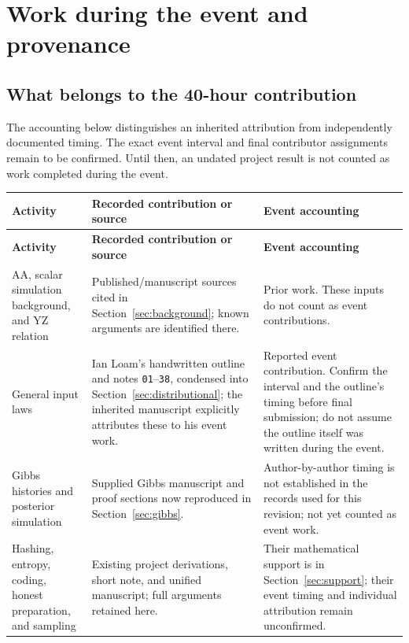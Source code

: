 \documentclass[11pt]{article}
\theoremstyle{definition}\newtheorem{definition}[theorem]{Definition}
\theoremstyle{remark}\newtheorem{remark}[theorem]{Remark}
\begin{document}
\clearpage
\section{Work during the event and provenance}\label{sec:event}

\subsection{What belongs to the 40-hour contribution}
The accounting below distinguishes an inherited attribution from independently documented timing. The exact event interval and final contributor assignments remain to be confirmed. Until then, an undated project result is not counted as work completed during the event.

\begingroup\small
\begin{longtable}{@{}>{\raggedright\arraybackslash}p{}>{\raggedright\arraybackslash}p{}>{\raggedright\arraybackslash}p{}@{}}
\toprule
\textbf{Activity} & \textbf{Recorded contribution or source} & \textbf{Event accounting}\\
\midrule
\endfirsthead
\toprule
\textbf{Activity} & \textbf{Recorded contribution or source} & \textbf{Event accounting}\\
\midrule
\endhead
\bottomrule
\endfoot
AA, scalar simulation background, and YZ relation & Published/manuscript sources cited in Section~\ref{sec:background}; known arguments are identified there. & Prior work. These inputs do not count as event contributions.\\[5pt]
General input laws & Ian Loam's handwritten outline and notes \texttt{01}--\texttt{38}, condensed into Section~\ref{sec:distributional}; the inherited manuscript explicitly attributes these to his event work. & Reported event contribution. Confirm the interval and the outline's timing before final submission; do not assume the outline itself was written during the event.\\[5pt]
Gibbs histories and posterior simulation & Supplied Gibbs manuscript and proof sections now reproduced in Section~\ref{sec:gibbs}. & Author-by-author timing is not established in the records used for this revision; not yet counted as event work.\\[5pt]
Hashing, entropy, coding, honest preparation, and sampling & Existing project derivations, short note, and unified manuscript; full arguments retained here. & Their mathematical support is in Section~\ref{sec:support}; their event timing and individual attribution remain unconfirmed.\\[5pt]

\end{longtable}
\end{document}
